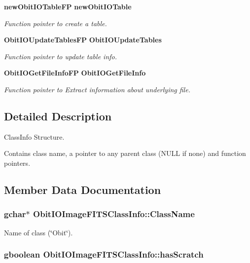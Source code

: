 \begin{CompactItemize}
{\bf new\-Obit\-IOTable\-FP} {\bf new\-Obit\-IOTable}
\begin{CompactList}\small\item\em Function pointer to create a table. \item\end{CompactList}\item 
{\bf Obit\-IOUpdate\-Tables\-FP} {\bf Obit\-IOUpdate\-Tables}
\begin{CompactList}\small\item\em Function pointer to update table info. \item\end{CompactList}\item 
{\bf Obit\-IOGet\-File\-Info\-FP} {\bf Obit\-IOGet\-File\-Info}
\begin{CompactList}\small\item\em Function pointer to Extract information about underlying file. \item\end{CompactList}\end{CompactItemize}


\subsection{Detailed Description}
Class\-Info Structure. 

Contains class name, a pointer to any parent class (NULL if none) and function pointers. 



\subsection{Member Data Documentation}
\subsubsection{\setlength{\rightskip}{0pt plus 5cm}gchar$\ast$ {\bf Obit\-IOImage\-FITSClass\-Info::Class\-Name}}\label{structObitIOImageFITSClassInfo_o2}


Name of class (\char`\"{}Obit\char`\"{}). 

\subsubsection{\setlength{\rightskip}{0pt plus 5cm}gboolean {\bf Obit\-IOImage\-FITSClass\-Info::has\-Scratch}}\label{structObitIOImageFITSClassInfo_o1}



